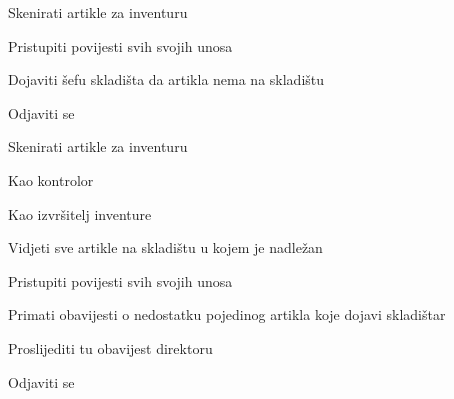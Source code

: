 			
			\begin{packed_enum}
				\item	{}
					
					\begin{packed_enum}
						\item Skenirati artikle za inventuru
						\item Pristupiti povijesti svih svojih unosa
						\item Dojaviti šefu skladišta da artikla nema na skladištu
						\item Odjaviti se
					\end{packed_enum}

				\item  {}
					
					\begin{packed_enum}
						\item Skenirati artikle za inventuru
							\begin{packed_enum}
								\item Kao kontrolor
								\item Kao izvršitelj inventure
							\end{packed_enum}
						\item Vidjeti sve artikle na skladištu u kojem je nadležan
						\item Pristupiti povijesti svih svojih unosa
						\item Primati obavijesti o nedostatku pojedinog artikla koje dojavi skladištar
							\begin{packed_enum}
								\item Proslijediti tu obavijest direktoru
							\end{packed_enum}
						\item Odjaviti se
					\end{packed_enum}

				\item  {}
				

\end{packed_enum}

